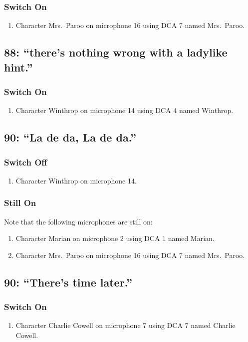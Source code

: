 \subsubsection* {Switch On}
\begin{enumerate}
\item Character Mrs.~Paroo on microphone 16 using DCA 7 named Mrs.~Paroo.
\end{enumerate}
\subsection* {88: ``there's nothing wrong with a ladylike hint.''}
\subsubsection* {Switch On}
\begin{enumerate}
\item Character Winthrop on microphone 14 using DCA 4 named Winthrop.
\end{enumerate}
\subsection* {90: ``La de da, La de da.''}
\subsubsection* {Switch Off}
\begin{enumerate}
\item Character Winthrop on microphone 14.
\end{enumerate}
\subsubsection* {Still On}
Note that the following microphones are still on:
\begin{enumerate}
\item Character Marian on microphone 2 using DCA 1 named Marian.
\item Character Mrs.~Paroo on microphone 16 using DCA 7 named Mrs.~Paroo.
\end{enumerate}
\subsection* {90: ``There's time later.''}
\subsubsection* {Switch On}
\begin{enumerate}
\item Character Charlie Cowell on microphone 7 using DCA 7 named Charlie Cowell.
\end{enumerate}
